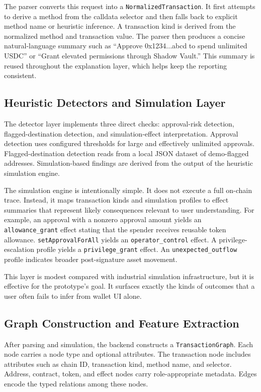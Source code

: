 \documentclass[11pt]{article}
\begin{document}
The parser converts this request into a \texttt{NormalizedTransaction}. It first attempts to derive a method from the calldata selector and then falls back to explicit method name or heuristic inference. A transaction kind is derived from the normalized method and transaction value. The parser then produces a concise natural-language summary such as ``Approve 0x1234...abcd to spend unlimited USDC'' or ``Grant elevated permissions through Shadow Vault.'' This summary is reused throughout the explanation layer, which helps keep the reporting consistent.

\subsection{Heuristic Detectors and Simulation Layer}

The detector layer implements three direct checks: approval-risk detection, flagged-destination detection, and simulation-effect interpretation. Approval detection uses configured thresholds for large and effectively unlimited approvals. Flagged-destination detection reads from a local JSON dataset of demo-flagged addresses. Simulation-based findings are derived from the output of the heuristic simulation engine.

The simulation engine is intentionally simple. It does not execute a full on-chain trace. Instead, it maps transaction kinds and simulation profiles to effect summaries that represent likely consequences relevant to user understanding. For example, an approval with a nonzero approval amount yields an \texttt{allowance\_grant} effect stating that the spender receives reusable token allowance. \texttt{setApprovalForAll} yields an \texttt{operator\_control} effect. A privilege-escalation profile yields a \texttt{privilege\_grant} effect. An \texttt{unexpected\_outflow} profile indicates broader post-signature asset movement.

This layer is modest compared with industrial simulation infrastructure, but it is effective for the prototype's goal. It surfaces exactly the kinds of outcomes that a user often fails to infer from wallet UI alone.

\subsection{Graph Construction and Feature Extraction}

After parsing and simulation, the backend constructs a \texttt{TransactionGraph}. Each node carries a node type and optional attributes. The transaction node includes attributes such as chain ID, transaction kind, method name, and selector. Address, contract, token, and effect nodes carry role-appropriate metadata. Edges encode the typed relations among these nodes.
\end{document}
